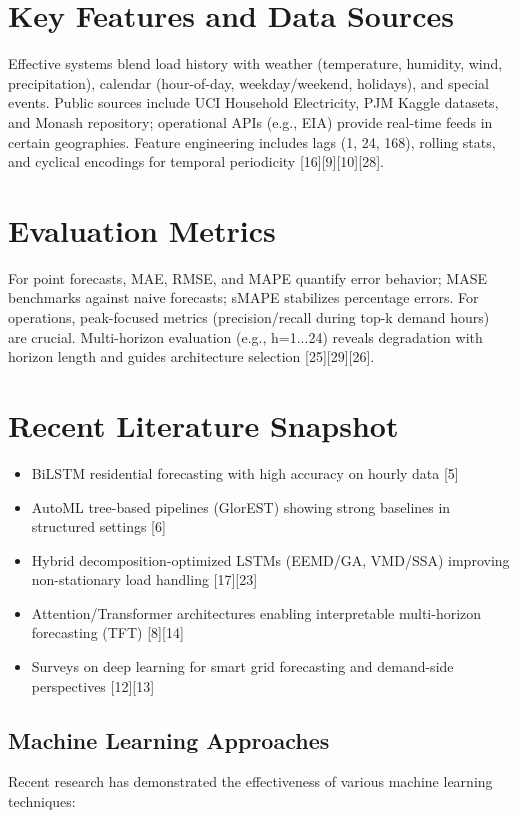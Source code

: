 \documentclass[12pt,a4paper]{report}
\begin{document}
\section{Key Features and Data Sources}
Effective systems blend load history with weather (temperature, humidity, wind, precipitation), calendar (hour-of-day, weekday/weekend, holidays), and special events. Public sources include UCI Household Electricity, PJM Kaggle datasets, and Monash repository; operational APIs (e.g., EIA) provide real-time feeds in certain geographies. Feature engineering includes lags (1, 24, 168), rolling stats, and cyclical encodings for temporal periodicity [16][9][10][28].

\section{Evaluation Metrics}
For point forecasts, MAE, RMSE, and MAPE quantify error behavior; MASE benchmarks against naive forecasts; sMAPE stabilizes percentage errors. For operations, peak-focused metrics (precision/recall during top-k demand hours) are crucial. Multi-horizon evaluation (e.g., h=1...24) reveals degradation with horizon length and guides architecture selection [25][29][26].

\section{Recent Literature Snapshot}
\begin{itemize}
\item BiLSTM residential forecasting with high accuracy on hourly data [5]
\item AutoML tree-based pipelines (GlorEST) showing strong baselines in structured settings [6]
\item Hybrid decomposition-optimized LSTMs (EEMD/GA, VMD/SSA) improving non-stationary load handling [17][23]
\item Attention/Transformer architectures enabling interpretable multi-horizon forecasting (TFT) [8][14]
\item Surveys on deep learning for smart grid forecasting and demand-side perspectives [12][13]
\end{itemize}

\subsection{Machine Learning Approaches}
Recent research has demonstrated the effectiveness of various machine learning techniques:
\end{document}
